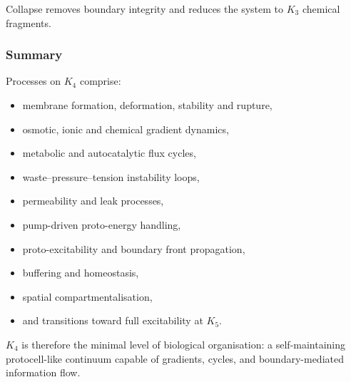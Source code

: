 Collapse removes boundary integrity and reduces the system to $K_3$
chemical fragments.

\subsubsection{Summary}

Processes on $K_4$ comprise:
\begin{itemize}
    \item membrane formation, deformation, stability and rupture,
    \item osmotic, ionic and chemical gradient dynamics,
    \item metabolic and autocatalytic flux cycles,
    \item waste–pressure–tension instability loops,
    \item permeability and leak processes,
    \item pump-driven proto-energy handling,
    \item proto-excitability and boundary front propagation,
    \item buffering and homeostasis,
    \item spatial compartmentalisation,
    \item and transitions toward full excitability at $K_5$.
\end{itemize}

$K_4$ is therefore the minimal level of biological organisation: a
self-maintaining protocell-like continuum capable of gradients, cycles,
and boundary-mediated information flow.
